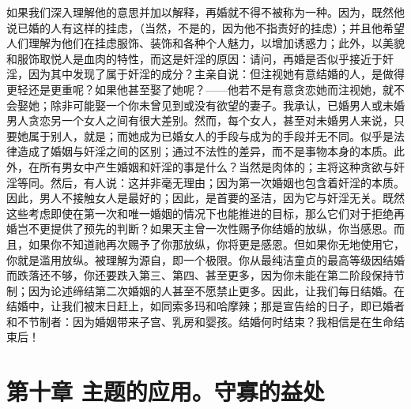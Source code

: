 如果我们深入理解他的意思并加以解释，再婚就不得不被称为一种。因为，既然他说已婚的人有这样的挂虑，（当然，不是的，因为他不指责好的挂虑）；并且他希望人们理解为他们在挂虑服饰、装饰和各种个人魅力，以增加诱惑力；此外，以美貌和服饰取悦人是血肉的特性，而这是奸淫的原因：请问，再婚是否似乎接近于奸淫，因为其中发现了属于奸淫的成分？主亲自说：但注视她有意结婚的人，是做得更轻还是更重呢？如果他甚至娶了她呢？——他若不是有意贪恋她而注视她，就不会娶她；除非可能娶一个你未曾见到或没有欲望的妻子。我承认，已婚男人或未婚男人贪恋另一个女人之间有很大差别。然而，每个女人，甚至对未婚男人来说，只要她属于别人，就是；而她成为已婚女人的手段与成为的手段并无不同。似乎是法律造成了婚姻与奸淫之间的区别；通过不法性的差异，而不是事物本身的本质。此外，在所有男女中产生婚姻和奸淫的事是什么？当然是肉体的；主将这种贪欲与奸淫等同。然后，有人说：这并非毫无理由；因为第一次婚姻也包含着奸淫的本质。因此，男人不接触女人是最好的；因此，是首要的圣洁，因为它与奸淫无关。既然这些考虑即使在第一次和唯一婚姻的情况下也能推进的目标，那么它们对于拒绝再婚岂不更提供了预先的判断？如果天主曾一次性赐予你结婚的放纵，你当感恩。而且，如果你不知道祂再次赐予了你那放纵，你将更是感恩。但如果你无地使用它，你就是滥用放纵。被理解为源自，即一个极限。你从最纯洁童贞的最高等级因结婚而跌落还不够，你还要跌入第三、第四、甚至更多，因为你未能在第二阶段保持节制；因为论述缔结第二次婚姻的人甚至不愿禁止更多。因此，让我们每日结婚。在结婚中，让我们被末日赶上，如同索多玛和哈摩辣；那是宣告给的日子，即已婚者和不节制者：因为婚姻带来子宫、乳房和婴孩。结婚何时结束？我相信是在生命结束后！\par


\section{第十章 主题的应用。守寡的益处}

